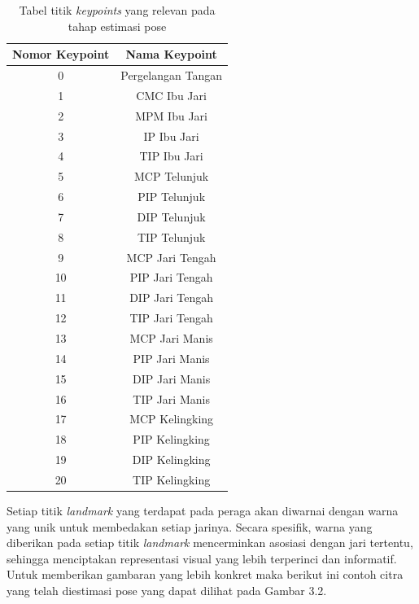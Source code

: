 \begin{table}[H]
\centering
    \caption{Tabel titik \emph{keypoints} yang relevan pada tahap estimasi pose}
    \label{tbl:titik keypoints}
    \begin{tabular}{|c|c|}
        \hline
        Nomor Keypoint & Nama Keypoint      \\ \hline
        0              & Pergelangan Tangan \\ \hline
        1              & CMC Ibu Jari       \\ \hline
        2              & MPM Ibu Jari       \\ \hline
        3              & IP Ibu Jari        \\ \hline
        4              & TIP Ibu Jari       \\ \hline
        5              & MCP Telunjuk       \\ \hline
        6              & PIP Telunjuk       \\ \hline
        7              & DIP Telunjuk       \\ \hline
        8              & TIP Telunjuk       \\ \hline
        9              & MCP Jari Tengah    \\ \hline
        10             & PIP Jari Tengah    \\ \hline
        11             & DIP Jari Tengah    \\ \hline
        12             & TIP Jari Tengah    \\ \hline
        13             & MCP Jari Manis     \\ \hline
        14             & PIP Jari Manis     \\ \hline
        15             & DIP Jari Manis     \\ \hline
        16             & TIP Jari Manis     \\ \hline
        17             & MCP Kelingking     \\ \hline
        18             & PIP Kelingking     \\ \hline
        19             & DIP Kelingking     \\ \hline
        20             & TIP Kelingking     \\ \hline
    \end{tabular}
\end{table}

Setiap titik \emph{landmark} yang terdapat pada peraga akan diwarnai dengan warna yang unik untuk membedakan setiap jarinya. Secara spesifik, warna yang diberikan pada setiap titik \emph{landmark} mencerminkan asosiasi dengan jari tertentu, sehingga menciptakan representasi visual yang lebih terperinci dan informatif. Untuk memberikan gambaran yang lebih konkret maka berikut ini contoh citra yang telah diestimasi pose yang dapat dilihat pada Gambar 3.2.

